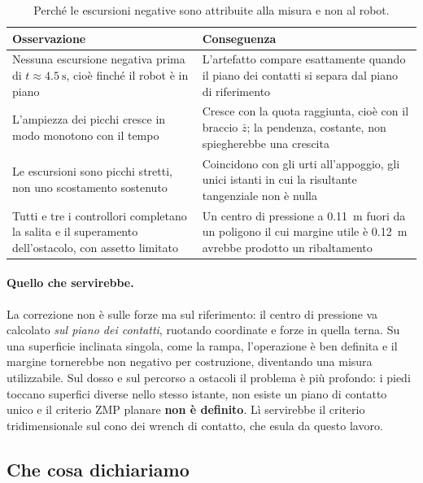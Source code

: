 \begin{table}[htbp]
\centering
\caption{Perché le escursioni negative sono attribuite alla misura e non al
robot.}
\label{tab:zmp-evidenze}
\small
\begin{tabular}{@{}p{58mm}p{72mm}@{}}
\toprule
\textbf{Osservazione} & \textbf{Conseguenza} \\
\midrule
Nessuna escursione negativa prima di
$t \approx \SI{4.5}{\second}$, cioè finché il robot è in piano &
L'artefatto compare esattamente quando il piano dei contatti si separa dal
piano di riferimento \\[3pt]
L'ampiezza dei picchi cresce in modo monotono con il tempo &
Cresce con la quota raggiunta, cioè con il braccio $\bar{z}$; la pendenza,
costante, non spiegherebbe una crescita \\[3pt]
Le escursioni sono picchi stretti, non uno scostamento sostenuto &
Coincidono con gli urti all'appoggio, gli unici istanti in cui la risultante
tangenziale non è nulla \\[3pt]
Tutti e tre i controllori completano la salita e il superamento
dell'ostacolo, con assetto limitato &
Un centro di pressione a \SI{0.11}{\meter} fuori da un poligono il cui
margine utile è \SI{0.12}{\meter} avrebbe prodotto un ribaltamento \\
\bottomrule
\end{tabular}
\end{table}

\paragraph{Quello che servirebbe.} La correzione non è sulle forze ma sul
riferimento: il centro di pressione va calcolato \emph{sul piano dei
contatti}, ruotando coordinate e forze in quella terna. Su una superficie
inclinata singola, come la rampa, l'operazione è ben definita e il margine
tornerebbe non negativo per costruzione, diventando una misura utilizzabile.
Sul dosso e sul percorso a ostacoli il problema è più profondo: i piedi
toccano superfici diverse nello stesso istante, non esiste un piano di
contatto unico e il criterio ZMP planare \textbf{non è definito}. Lì servirebbe
il criterio tridimensionale sul cono dei wrench di contatto, che esula da
questo lavoro.

\subsection{Che cosa dichiariamo}

